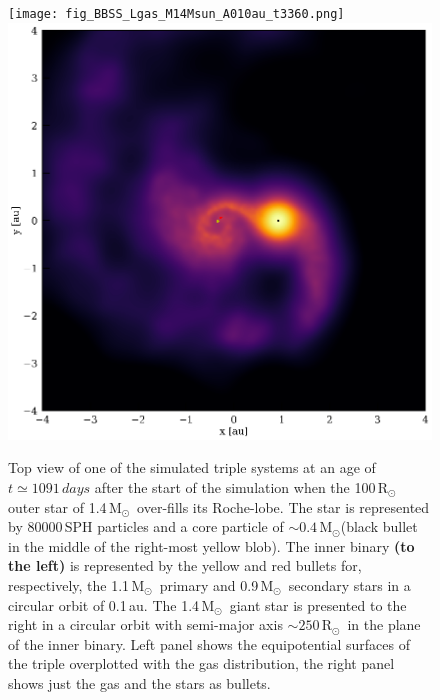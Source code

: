 \documentclass[twocolumn]{aastex62}
\newcommand{\MSun}{\mbox{M$_\odot$}}
\newcommand{\RSun}{\mbox{R$_\odot$}}
\begin{document}
\begin{figure}[ht!]
  \texttt{[image: fig\_BBSS\_Lgas\_M14Msun\_A010au\_t3360.png]}
~  \includegraphics[width=0.5\linewidth]{fig_BBSS_gas_M14Msun_A010au_t3360.png}
  \caption{ Top view of one of the simulated triple systems at an age
    of $t \simeq 1091\,days$ after the start of the simulation when
    the 100\,\RSun\, outer star of 1.4\,\MSun\, over-fills its
    Roche-lobe.  The star is represented by 80000\,SPH particles and a
    core particle of $\sim 0.4$\,\MSun (black bullet in the middle of
    the right-most yellow blob). The inner binary \textbf{(to the
      left)} is represented by the yellow and red bullets for,
    respectively, the 1.1\,\MSun\, primary and 0.9\,\MSun\, secondary
    stars in a circular orbit of 0.1\,au. The 1.4\,\MSun\, giant star
    is presented to the right in a circular orbit with semi-major axis
    $\sim 250$\,\RSun\, in the plane of the inner binary.  Left panel
    shows the equipotential surfaces of the triple overplotted with
    the gas distribution, the right panel shows just the gas and the
    stars as bullets.
\label{fig:topview_at_t1000day}}
\end{figure}
\end{document}
